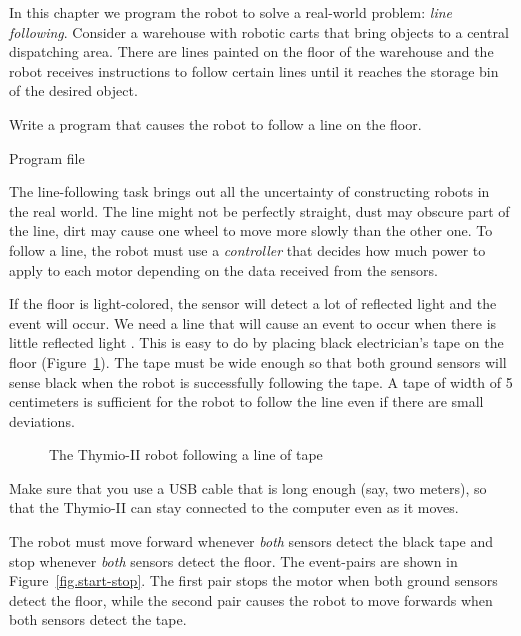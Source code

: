 \label{ch.line}

In this chapter we program the robot to solve a real-world problem:
\emph{line following}. Consider a warehouse with robotic carts that
bring objects to a central dispatching area. There are lines painted on
the floor of the warehouse and the robot receives instructions to follow
certain lines until it reaches the storage bin of the desired object.

Write a program that causes the robot to follow a line on the floor.

{\raggedleft \hfill Program file }

The line-following task brings out all the uncertainty of constructing
robots in the real world. The line might not be perfectly straight, dust
may obscure part of the line, dirt may cause one wheel to move more
slowly than the other one. To follow a line, the robot must use a
\emph{controller} that decides how much power to apply to each motor
depending on the data received from the sensors.


If the floor is light-colored, the sensor will detect a lot of reflected
light and the event  will occur. We need a line
that will cause an event to occur when there is little reflected light
. This is easy to do by placing black
electrician's tape on the floor (Figure~\ref{fig.tape}). The tape must
be wide enough so that both ground sensors will sense black when the
robot is successfully following the tape. A tape of width of 5
centimeters is sufficient for the robot to follow the line even if there
are small deviations.

\begin{figure}
\begin{center}
\caption{The Thymio-II robot following a line of tape}\label{fig.tape}
\end{center}
\end{figure}

Make sure that you use a USB cable that is long enough (say, two
meters), so that the Thymio-II can stay connected to the computer even
as it moves.


The robot must move forward whenever \emph{both} sensors detect the
black tape and stop whenever \emph{both} sensors detect the floor. The
event-pairs are shown in Figure~\ref{fig.start-stop}. The first pair
stops the motor when both ground sensors detect the floor, while the
second pair causes the robot to move forwards when both sensors detect
the tape.

